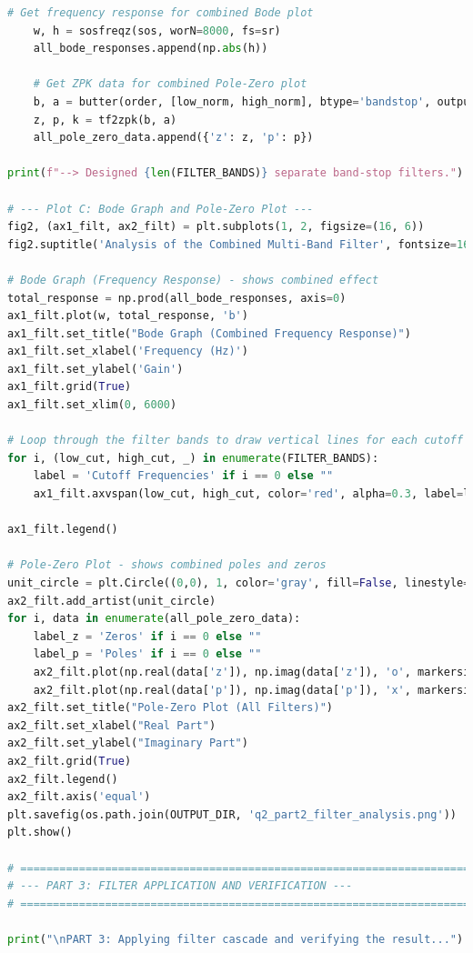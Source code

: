 \documentclass[11pt, a4paper]{article}
\begin{document}
\begin{lstlisting}[language=Python, caption={Python script for Question 2.}]
    # Get frequency response for combined Bode plot
    w, h = sosfreqz(sos, worN=8000, fs=sr)
    all_bode_responses.append(np.abs(h))
    
    # Get ZPK data for combined Pole-Zero plot
    b, a = butter(order, [low_norm, high_norm], btype='bandstop', output='ba')
    z, p, k = tf2zpk(b, a)
    all_pole_zero_data.append({'z': z, 'p': p})

print(f"--> Designed {len(FILTER_BANDS)} separate band-stop filters.")

# --- Plot C: Bode Graph and Pole-Zero Plot ---
fig2, (ax1_filt, ax2_filt) = plt.subplots(1, 2, figsize=(16, 6))
fig2.suptitle('Analysis of the Combined Multi-Band Filter', fontsize=16)

# Bode Graph (Frequency Response) - shows combined effect
total_response = np.prod(all_bode_responses, axis=0)
ax1_filt.plot(w, total_response, 'b')
ax1_filt.set_title("Bode Graph (Combined Frequency Response)")
ax1_filt.set_xlabel('Frequency (Hz)')
ax1_filt.set_ylabel('Gain')
ax1_filt.grid(True)
ax1_filt.set_xlim(0, 6000) 

# Loop through the filter bands to draw vertical lines for each cutoff
for i, (low_cut, high_cut, _) in enumerate(FILTER_BANDS):
    label = 'Cutoff Frequencies' if i == 0 else ""
    ax1_filt.axvspan(low_cut, high_cut, color='red', alpha=0.3, label=label)
    
ax1_filt.legend()

# Pole-Zero Plot - shows combined poles and zeros
unit_circle = plt.Circle((0,0), 1, color='gray', fill=False, linestyle='--')
ax2_filt.add_artist(unit_circle)
for i, data in enumerate(all_pole_zero_data):
    label_z = 'Zeros' if i == 0 else ""
    label_p = 'Poles' if i == 0 else ""
    ax2_filt.plot(np.real(data['z']), np.imag(data['z']), 'o', markersize=8, fillstyle='none', label=label_z)
    ax2_filt.plot(np.real(data['p']), np.imag(data['p']), 'x', markersize=8, label=label_p)
ax2_filt.set_title("Pole-Zero Plot (All Filters)")
ax2_filt.set_xlabel("Real Part")
ax2_filt.set_ylabel("Imaginary Part")
ax2_filt.grid(True)
ax2_filt.legend()
ax2_filt.axis('equal')
plt.savefig(os.path.join(OUTPUT_DIR, 'q2_part2_filter_analysis.png'))
plt.show()

# ============================================================================
# --- PART 3: FILTER APPLICATION AND VERIFICATION ---
# ============================================================================

print("\nPART 3: Applying filter cascade and verifying the result...")


\end{lstlisting}
\end{document}
